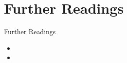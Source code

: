 


\section{Further Readings}

 {\begin{frame}{Further Readings}
	  \begin{itemize}
		  \setlength\itemsep{0.3cm}
		  \item {}
		  \item {}
	  \end{itemize}



  \end{frame}
 }



